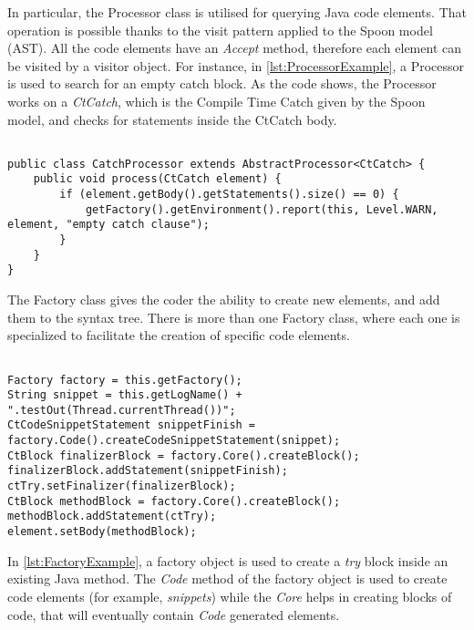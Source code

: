 In particular, the Processor class is utilised for querying Java code elements. That operation is possible thanks to the visit pattern applied to the Spoon model (AST). All the code elements have an \emph{Accept} method, therefore each element can be visited by a visitor object. For instance, in \autoref{lst:ProcessorExample}, a Processor is used to search for an empty catch block. As the code shows, the Processor works on a \textit{CtCatch}, which is the Compile Time Catch given by the Spoon model, and checks for statements inside the CtCatch body.

\begin{lstlisting}[caption={Processor example taken from \href{http://spoon.gforge.inria.fr/processor.html}{Spoon documentation}},label={lst:ProcessorExample}]% Start your code-block

public class CatchProcessor extends AbstractProcessor<CtCatch> {
	public void process(CtCatch element) {
		if (element.getBody().getStatements().size() == 0) {
			getFactory().getEnvironment().report(this, Level.WARN, element, "empty catch clause");
		}
	}
}
\end{lstlisting}

The Factory class gives the coder the ability to create new elements, and add them to the syntax tree. There is more than one Factory class, where each one is specialized to facilitate the creation of specific code elements.

\begin{lstlisting}[caption={Factory example taken from \href{https://www.programcreek.com/java-api-examples/index.php?api=spoon.reflect.factory.Factory}{Spoon Projects}},label={lst:FactoryExample}]% Start your code-block

Factory factory = this.getFactory();
String snippet = this.getLogName() + ".testOut(Thread.currentThread())";
CtCodeSnippetStatement snippetFinish = factory.Code().createCodeSnippetStatement(snippet);
CtBlock finalizerBlock = factory.Core().createBlock();
finalizerBlock.addStatement(snippetFinish);
ctTry.setFinalizer(finalizerBlock);
CtBlock methodBlock = factory.Core().createBlock();
methodBlock.addStatement(ctTry);
element.setBody(methodBlock);
\end{lstlisting}

In \autoref{lst:FactoryExample}, a factory object is used to create a \textit{try} block inside an existing Java method. The \emph{Code} method of the factory object is used to create code elements (for example, \textit{snippets}) while the \emph{Core} helps in creating blocks of code, that will eventually contain \emph{Code} generated elements.